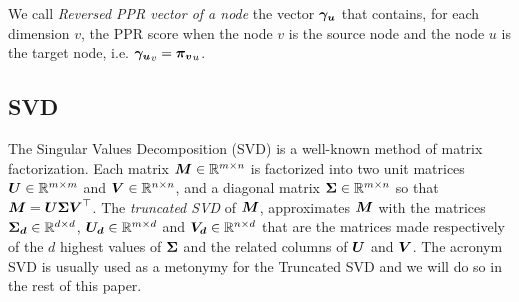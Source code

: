 We call \textit{Reversed PPR vector of a node} the vector $\boldsymbol{\gamma_u}$ that contains, for each dimension $v$, the PPR score when the node $v$ is the source node and the node $u$ is the target node, i.e. $\boldsymbol{\gamma_u}_v = \boldsymbol{\pi_v}_u$.

\subsection{SVD} \label{subsec:back_svd}
The Singular Values Decomposition (SVD) is a well-known method of matrix factorization. Each matrix $\boldsymbol{M} \in \mathbb{R}^{m\times n}$ is factorized into two unit matrices $\boldsymbol{U} \in \mathbb{R}^{m\times m}$ and $\boldsymbol{V} \in \mathbb{R}^{n\times n}$, and a diagonal matrix $\boldsymbol{\Sigma} \in \mathbb{R}^{m\times n}$ so that $\boldsymbol{M} = \boldsymbol{U} \boldsymbol{\Sigma} \boldsymbol{V}^\top$. %
The \textit{truncated SVD} of $\boldsymbol{M}$, approximates $\boldsymbol{M}$ with the matrices $\boldsymbol{\Sigma_d} \in \mathbb{R}^{d\times d}$, $\boldsymbol{U_d} \in \mathbb{R}^{m\times d}$ and $\boldsymbol{V_d} \in \mathbb{R}^{n\times d}$ that are the matrices made respectively of the $d$ highest values of $\boldsymbol{\Sigma}$ and the related columns of $\boldsymbol{U}$ and $\boldsymbol{V}$. The acronym SVD is usually used as a metonymy for the Truncated SVD and we will do so in the rest of this paper.

